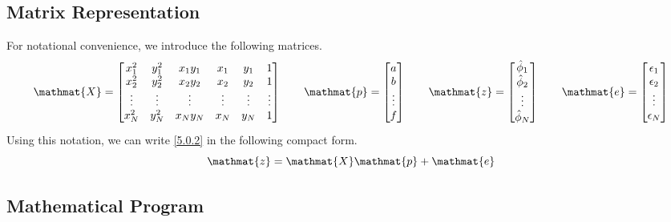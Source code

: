 \documentclass[12pt]{report}
\newcommand{\mat}[1]{\mathmat{#1}}
\begin{document}
\subsection{Matrix Representation}
For notational convenience, we introduce the following matrices.
%
\begin{equation}\label{5.0.3}
    \mat{X} =
    \begin{bmatrix}
        x_1^2  & y_1^2  & x_1y_1 & x_1    & y_1    & 1 \\
        x_2^2  & y_2^2  & x_2y_2 & x_2    & y_2    & 1 \\
        \vdots & \vdots & \vdots & \vdots & \vdots & \vdots \\
        x_N^2  & y_N^2  & x_Ny_N & x_N    & y_N    & 1
    \end{bmatrix}
    \qquad
    \mat{p} =
    \begin{bmatrix}
        a \\
        b \\
        \vdots \\
        f
    \end{bmatrix}
    \qquad
    \mat{z} =
    \begin{bmatrix}
        \hat{\phi}_1 \\
        \hat{\phi}_2 \\
        \vdots \\
        \hat{\phi}_N \\
    \end{bmatrix}
    \qquad
    \mat{e} =
    \begin{bmatrix}
        \epsilon_1 \\
        \epsilon_2 \\
        \vdots \\
        \epsilon_N \\
    \end{bmatrix}
\end{equation}
%
Using this notation, we can write \eqref{5.0.2} in the following compact form.
%
\begin{equation}\label{5.0.4}
    \mat{z} = \mat{X} \mat{p} + \mat{e}
\end{equation}

\subsection{Mathematical Program}
\end{document}

